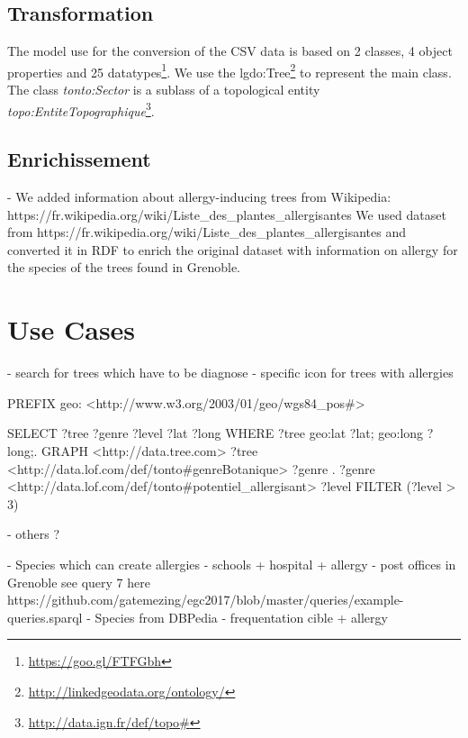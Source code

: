 \documentclass[a4paper,pagenum,english]{rnti}
\begin{document}
{\subsection{Transformation}
The model use for the conversion of the CSV data is based on 2 classes, 4 object properties and 25 datatypes\footnote{\url{https://goo.gl/FTFGbh}}.  
We use the lgdo:Tree\footnote{\url{http://linkedgeodata.org/ontology/}} to represent the main class. The class \textit{tonto:Sector} is a sublass of a topological entity \textit{topo:EntiteTopographique}\footnote{\url{http://data.ign.fr/def/topo#}}. 


\subsection{Enrichissement}
	- We added information about allergy-inducing trees from Wikipedia: https://fr.wikipedia.org/wiki/Liste_des_plantes_allergisantes
We used dataset from https://fr.wikipedia.org/wiki/Liste_des_plantes_allergisantes and converted it in RDF to enrich the original dataset with information on allergy for the species of the trees found in Grenoble. 

\section{Use Cases}
- search for trees which have to be diagnose
- specific icon for trees with allergies

PREFIX geo: <http://www.w3.org/2003/01/geo/wgs84_pos#>

SELECT ?tree ?genre ?level ?lat ?long
WHERE {
  ?tree geo:lat ?lat;
        geo:long ?long;.
  GRAPH <http://data.tree.com> {
    ?tree <http://data.lof.com/def/tonto#genreBotanique> ?genre .
    ?genre <http://data.lof.com/def/tonto#potentiel_allergisant> ?level }
  FILTER (?level > 3)
}

- others ?

- Species which can create allergies
- schools + hospital + allergy
- post offices in Grenoble  see query 7 here https://github.com/gatemezing/egc2017/blob/master/queries/example-queries.sparql 
- Species from DBPedia
- frequentation cible + allergy

}
\end{document}
